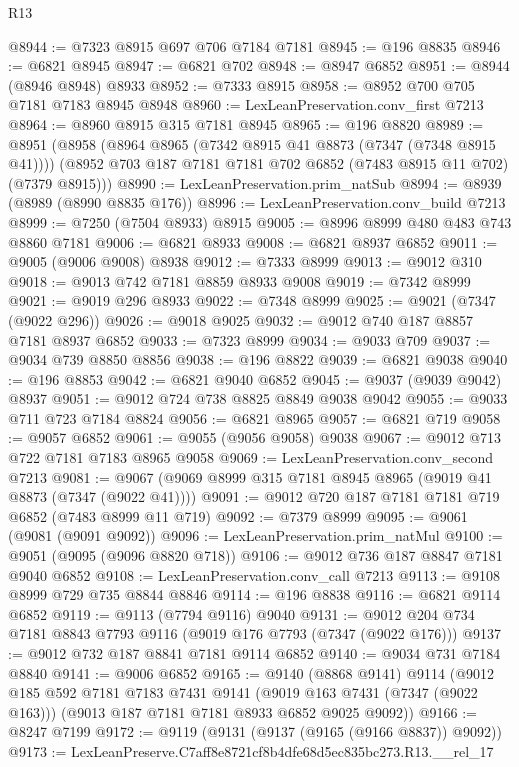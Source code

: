 \begin{lexlean}{R13}
\begin{coremodule}
@8944 := @7323 @8915 @697 @706 @7184 @7181
@8945 := @196 @8835
@8946 := @6821 @8945
@8947 := @6821 @702
@8948 := @8947 @6852
@8951 := @8944 (@8946 @8948) @8933
@8952 := @7333 @8915
@8958 := @8952 @700 @705 @7181 @7183 @8945 @8948
@8960 := LexLeanPreservation.conv_first @7213
@8964 := @8960 @8915 @315 @7181 @8945
@8965 := @196 @8820
@8989 := @8951
    (@8958
      (@8964 @8965 (@7342 @8915 @41 @8873 (@7347 (@7348 @8915 @41))))
      (@8952 @703 @187 @7181 @7181 @702 @6852 (@7483 @8915 @11 @702) (@7379 @8915)))
@8990 := LexLeanPreservation.prim_natSub
@8994 := @8939 (@8989 (@8990 @8835 @176))
@8996 := LexLeanPreservation.conv_build @7213
@8999 := @7250 (@7504 @8933) @8915
@9005 := @8996 @8999 @480 @483 @743 @8860 @7181
@9006 := @6821 @8933
@9008 := @6821 @8937 @6852
@9011 := @9005 (@9006 @9008) @8938
@9012 := @7333 @8999
@9013 := @9012 @310
@9018 := @9013 @742 @7181 @8859 @8933 @9008
@9019 := @7342 @8999
@9021 := @9019 @296 @8933
@9022 := @7348 @8999
@9025 := @9021 (@7347 (@9022 @296))
@9026 := @9018 @9025
@9032 := @9012 @740 @187 @8857 @7181 @8937 @6852
@9033 := @7323 @8999
@9034 := @9033 @709
@9037 := @9034 @739 @8850 @8856
@9038 := @196 @8822
@9039 := @6821 @9038
@9040 := @196 @8853
@9042 := @6821 @9040 @6852
@9045 := @9037 (@9039 @9042) @8937
@9051 := @9012 @724 @738 @8825 @8849 @9038 @9042
@9055 := @9033 @711 @723 @7184 @8824
@9056 := @6821 @8965
@9057 := @6821 @719
@9058 := @9057 @6852
@9061 := @9055 (@9056 @9058) @9038
@9067 := @9012 @713 @722 @7181 @7183 @8965 @9058
@9069 := LexLeanPreservation.conv_second @7213
@9081 := @9067 (@9069 @8999 @315 @7181 @8945 @8965 (@9019 @41 @8873 (@7347 (@9022 @41))))
@9091 := @9012 @720 @187 @7181 @7181 @719 @6852 (@7483 @8999 @11 @719)
@9092 := @7379 @8999
@9095 := @9061 (@9081 (@9091 @9092))
@9096 := LexLeanPreservation.prim_natMul
@9100 := @9051 (@9095 (@9096 @8820 @718))
@9106 := @9012 @736 @187 @8847 @7181 @9040 @6852
@9108 := LexLeanPreservation.conv_call @7213
@9113 := @9108 @8999 @729 @735 @8844 @8846
@9114 := @196 @8838
@9116 := @6821 @9114 @6852
@9119 := @9113 (@7794 @9116) @9040
@9131 := @9012 @204 @734 @7181 @8843 @7793 @9116 (@9019 @176 @7793 (@7347 (@9022 @176)))
@9137 := @9012 @732 @187 @8841 @7181 @9114 @6852
@9140 := @9034 @731 @7184 @8840
@9141 := @9006 @6852
@9165 := @9140
    (@8868 @9141)
    @9114
    (@9012
      @185
      @592
      @7181
      @7183
      @7431
      @9141
      (@9019 @163 @7431 (@7347 (@9022 @163)))
      (@9013 @187 @7181 @7181 @8933 @6852 @9025 @9092))
@9166 := @8247 @7199
@9172 := @9119 (@9131 (@9137 (@9165 (@9166 @8837)) @9092))
@9173 := LexLeanPreserve.C7aff8e8721cf8b4dfe68d5ec835bc273.R13.__rel_17

\end{coremodule}
\end{lexlean}
